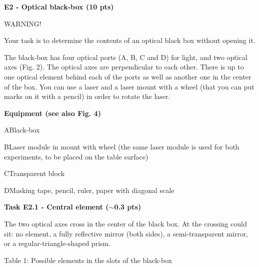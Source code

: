 {\large\textbf{E2 - Optical black-box (10 pts)}}

{\LARGE WARNING!}

\noindent{}

Your task is to determine the contents of an optical black box without opening
it.

The black-box has four optical ports (A, B, C and D) for light, and two optical
axes (Fig. 2). The optical axes are perpendicular to each other. There is up to
one optical element behind each of the ports as well as another one in the
center of the box. You can use a laser and a laser mount with a wheel (that you
can put marks on it with a pencil) in order to rotate the laser.

\textbf{Equipment (see also Fig. 4)}

A\quad Black-box

B\quad Laser module in mount with wheel (the same laser module is used for both
experiments, to be placed on the table surface)

C\quad Transparent block

D\quad Masking tape, pencil, ruler, paper with diagonal scale

\noindent{}

\textbf{Task E2.1 - Central element ($\sim$0.3 pts)}

The two optical axes cross in the center of the black box. At the crossing
could sit: no element, a fully reflective mirror (both sides), a
semi-transparent mirror, or a regular-triangle-shaped prism.

Table 1: Possible elements in the slots of the black-box

